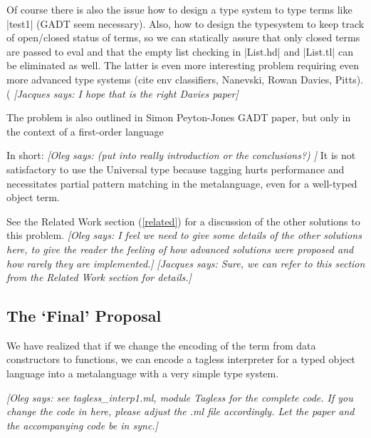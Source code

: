 \documentclass[preprint]{sigplanconf}
\newcommand{\jacques}[1]{{\it [Jacques says: #1]}}
\newcommand{\oleg}[1]{{\it [Oleg says: #1]}}
\begin{document}
Of course there is also the issue how to design a type system to type
terms like |test1| (GADT seem necessary). Also, how to design the
typesystem to keep track of open/closed status of terms, so we can
statically assure that only closed terms are passed to eval and that
the empty list checking in |List.hd| and |List.tl| can be eliminated
as well. The latter is even more interesting problem requiring even
more advanced type systems (cite env classifiers, Nanevski, Rowan
Davies, Pitts).
(\cite{WalidPOPLo3,NanevskiICFP02,NanevskiJFP05,DaviesJACM01}
\jacques{I hope that is the right Davies paper}

The problem is also outlined in Simon Peyton-Jones GADT paper, but
only in the context of a first-order language

In short: \oleg{ (put into really introduction or the conclusions?) }
It is not satisfactory
to use the Universal type because tagging hurts performance and
necessitates partial pattern matching in the metalanguage, even for a
well-typed object term.  



See the Related Work section (\ref{related}) for a discussion of the other
solutions to this problem.
\oleg{I feel we need to give some details of the other solutions here, 
to give the reader the feeling of
how advanced solutions were proposed and how rarely they are
implemented.}
\jacques{Sure, we can refer to this section from the Related Work section
for details.}


\subsection{The `Final' Proposal}\label{ourapproach}

We have realized that if we change the encoding of the term from data
constructors to functions, we can encode a tagless interpreter for a
typed object language into a metalanguage with a very simple type system.

\oleg{see tagless\_interp1.ml, module Tagless for the complete code.
If you change the code in here, please adjust the .ml file
accordingly. Let the paper and the accompanying code be in sync.}
\end{document}
